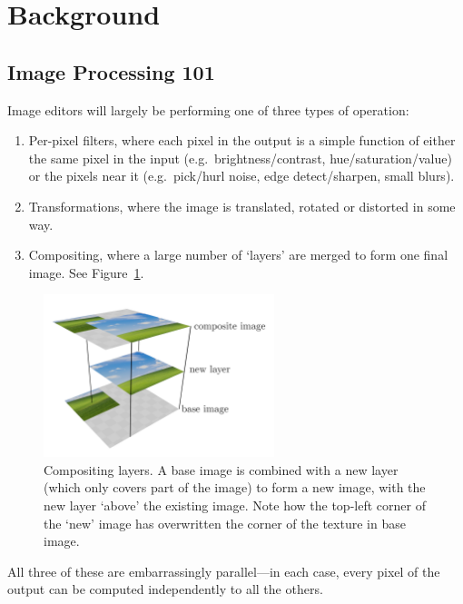 \documentclass[12pt]{article}
\begin{document}
\section{Background}

\subsection{Image Processing 101}

Image editors will largely be performing one of three types of operation:

\begin{enumerate}
    \item Per-pixel filters, where each pixel in the output is a simple function of either the same
        pixel in the input (e.g.\ brightness/contrast, hue/saturation/value) or the pixels near it
        (e.g.\ pick/hurl noise, edge detect/sharpen, small blurs).
    \item Transformations, where the image is translated, rotated or distorted in some way.
    \item Compositing, where a large number of `layers' are merged to form one final image.  See
        Figure~\ref{fig:compositing}.
\end{enumerate}

\begin{figure}
    \begin{center}
        \includegraphics[width=0.6\textwidth]{compositing}
    \end{center}
    \caption{Compositing layers.  A base image is combined with a new layer (which only covers part
    of the image) to form a new image, with the new layer `above' the existing image.  Note how the
    top-left corner of the `new' image has overwritten the corner of the texture in base
    image.}\label{fig:compositing}
\end{figure}

All three of these are embarrassingly parallel---in each case, every pixel of the output can be
computed independently to all the others.
\end{document}
